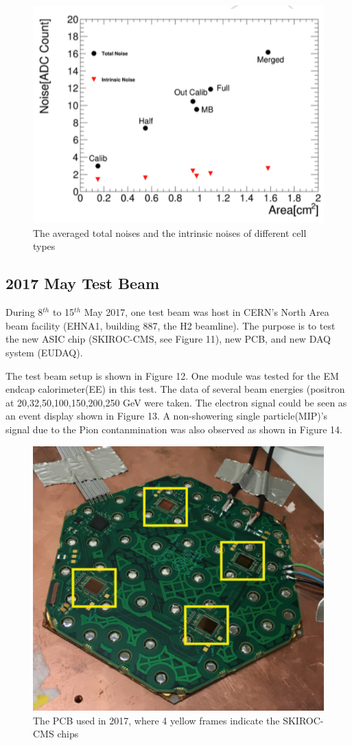\documentclass{article}
\begin{document}
\begin{figure}
\centering
\includegraphics[width=.7\textwidth]{figures/2016Paper_Intrinsic_noise.pdf}
\caption{The averaged total noises and the intrinsic noises of different cell types}
\label{pics:blablabla}
\end{figure}



\subsection{2017 May Test Beam}

During 8$^{th}$ to 15$^{th}$ May 2017, one test beam was host in CERN's North Area beam facility (EHNA1, building 887, the H2 beamline). The purpose is to test the new ASIC chip (SKIROC-CMS, see Figure 11), new PCB, and new DAQ system (EUDAQ).

The test beam setup is shown in Figure 12. One module was tested for the EM endcap calorimeter(EE) in this test. The data of several beam energies (positron at 20,32,50,100,150,200,250 GeV \cite{May 2017 TB google doc} were taken. The electron signal could be seen as an event display shown in Figure 13. A non-showering single particle(MIP)'s signal due to the Pion contanmination was also observed as shown in Figure 14.   

\begin{figure}

\centering
\includegraphics[width=.7\textwidth]{figures/SKIROC-CMS2_chip.pdf}

\caption{The PCB used in 2017, where 4 yellow frames indicate the SKIROC-CMS chips}
\label{pics:blablabla}
\end{figure}
\end{document}
